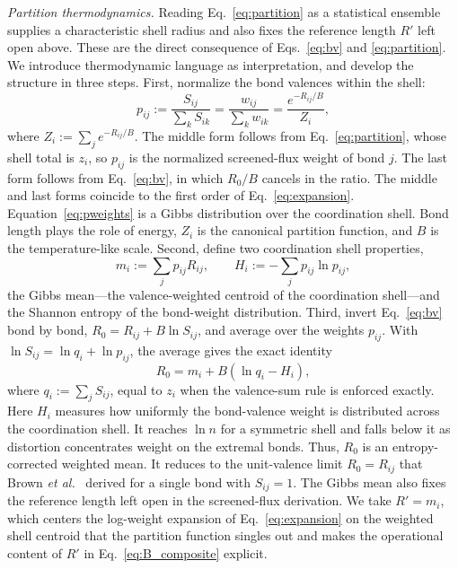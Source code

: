 \documentclass[aps,prmaterials,twocolumn,10pt,superscriptaddress,floatfix]{revtex4-2}
\newcommand{\runinsec}[1]{\medskip\emph{#1}}
\begin{document}
\runinsec{Partition thermodynamics.} Reading
Eq.~\eqref{eq:partition} as a statistical ensemble supplies a characteristic
shell radius and also fixes the reference length $R'$ left open above.
These are the direct consequence of Eqs.~\eqref{eq:bv} and
\eqref{eq:partition}.  We introduce thermodynamic language as interpretation,
and develop the structure in three
steps.  First, normalize the bond valences within the shell:
\begin{equation}\label{eq:pweights}
p_{ij}:=\frac{S_{ij}}{\sum_k S_{ik}}
=\frac{w_{ij}}{\sum_k w_{ik}}
=\frac{e^{-R_{ij}/B}}{Z_i},
\end{equation}
where $Z_i:=\sum_j e^{-R_{ij}/B}$.  The middle form follows from
Eq.~\eqref{eq:partition}, whose shell total is $z_i$, so $p_{ij}$ is
the normalized screened-flux weight of bond $j$.  The last form
follows from Eq.~\eqref{eq:bv}, in which $R_0/B$ cancels in the
ratio.  The middle and last forms coincide to the first order of
Eq.~\eqref{eq:expansion}.  Equation~\eqref{eq:pweights} is a Gibbs distribution over the
coordination shell.  Bond length plays the role of energy, $Z_i$ is
the canonical partition function, and $B$ is the temperature-like
scale. Second, define two coordination shell properties,
\begin{equation}\label{eq:mean_entropy}
m_i:=\sum_j p_{ij}R_{ij},
\qquad
H_i:=-\sum_j p_{ij}\ln p_{ij},
\end{equation}
the Gibbs mean---the valence-weighted centroid of the
coordination shell---and the Shannon entropy of the bond-weight
distribution.  Third, invert Eq.~\eqref{eq:bv} bond by bond,
$R_0=R_{ij}+B\ln S_{ij}$, and average over the weights $p_{ij}$.
With $\ln S_{ij}=\ln q_i+\ln p_{ij}$, the average gives the exact
identity
\begin{equation}\label{eq:R0_identity}
R_0 = m_i + B(\ln q_i - H_i),
\end{equation}
where $q_i:=\sum_j S_{ij}$, equal to $z_i$ when the valence-sum rule
is enforced exactly.  Here $H_i$ measures how uniformly the
bond-valence weight is distributed across the coordination shell.  It
reaches $\ln n$ for a symmetric shell and falls below it as distortion
concentrates weight on the extremal bonds.
Thus, $R_0$ is an entropy-corrected weighted
mean. It reduces to the unit-valence limit $R_0=R_{ij}$ that Brown
\emph{et al.}\ \cite{Brown2016} derived for a single bond with $S_{ij}=1$.
The Gibbs mean also fixes the reference length left open in
the screened-flux derivation. We take $R'=m_i$, which centers the
log-weight expansion of Eq.~\eqref{eq:expansion} on the weighted
shell centroid that the partition function singles out and makes the
operational content of $R'$ in Eq.~\eqref{eq:B_composite} explicit.
\end{document}
